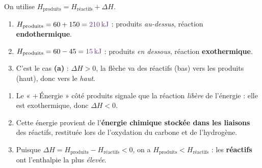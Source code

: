 \documentclass[11pt,a4paper]{article}
\newcommand{\dH}{\Delta H}
\newcommand{\rep}[1]{\textcolor{primarydark}{\textbf{#1}}}
\begin{document}
\begin{correction}
On utilise $H_{\text{produits}} = H_{\text{réactifs}} + \dH$.
\begin{enumerate}[label=\alph*),leftmargin=2em,topsep=2pt,itemsep=2pt]
  \item $H_{\text{produits}} = 60 + 150 = \rep{\SI{210}{\kilo\joule}}$ : produits \emph{au-dessus},
        réaction \rep{endothermique}.
  \item $H_{\text{produits}} = 60 - 45 = \rep{\SI{15}{\kilo\joule}}$ : produits \emph{en dessous},
        réaction \rep{exothermique}.
  \item C'est le cas \rep{(a)} : $\dH>0$, la flèche va des réactifs (bas) vers les produits (haut), donc
        vers le \emph{haut}.
\end{enumerate}
\end{correction}

\begin{correction}
\begin{enumerate}[label=\alph*),leftmargin=2em,topsep=2pt,itemsep=2pt]
  \item Le « $+\,$Énergie » côté produits signale que la réaction \emph{libère} de l'énergie : elle est
        exothermique, donc \rep{$\dH<0$}.
  \item Cette énergie provient de l'\rep{énergie chimique stockée dans les liaisons} des réactifs,
        restituée lors de l'oxydation du carbone et de l'hydrogène.
  \item Puisque $\dH = H_{\text{produits}} - H_{\text{réactifs}} < 0$, on a $H_{\text{produits}} <
        H_{\text{réactifs}}$ : les \rep{réactifs} ont l'enthalpie la plus \emph{élevée}.
\end{enumerate}
\end{correction}
\end{document}
